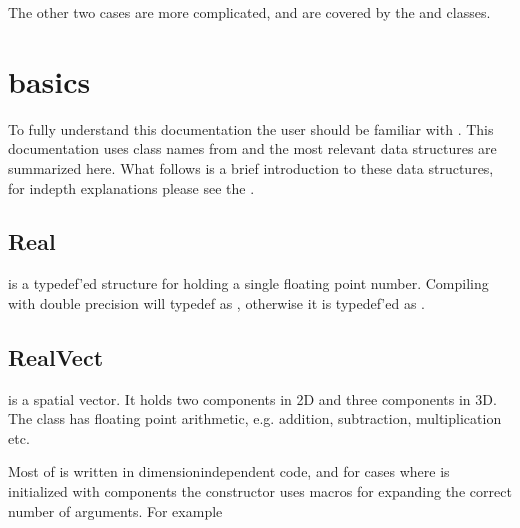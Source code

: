 \documentclass[letterpaper,10pt,english]{sphinxmanual}
\begin{document}
The other two cases are more complicated, and are covered by the {\hyperref[\detokenize{Source/GeoCoarsener:chap-geocoarsener}]{}} and {\hyperref[\detokenize{Source/CellTagger:chap-celltagger}]{}} classes.


\section{ basics}
\label{\detokenize{Source/ChomboBasics:chombo-3-basics}}\label{\detokenize{Source/ChomboBasics:chap-basics}}\label{\detokenize{Source/ChomboBasics::doc}}
To fully understand this documentation the user should be familiar with .
This documentation uses class names from  and the most relevant  data structures are summarized here.
What follows is a  brief introduction to these data structures, for in\sphinxhyphen{}depth explanations please see the .


\subsection{Real}
\label{\detokenize{Source/ChomboBasics:real}}
 is a typedef’ed structure for holding a single floating point number.
Compiling with double precision will typedef  as , otherwise it is typedef’ed as .


\subsection{RealVect}
\label{\detokenize{Source/ChomboBasics:realvect}}
 is a spatial vector.
It holds two  components in 2D and three  components in 3D.
The  class has floating point arithmetic, e.g. addition, subtraction, multiplication etc.

Most of  is written in dimension\sphinxhyphen{}independent code, and for cases where  is initialized with components the constructor uses  macros for expanding the correct number of arguments.
For example
\end{document}
